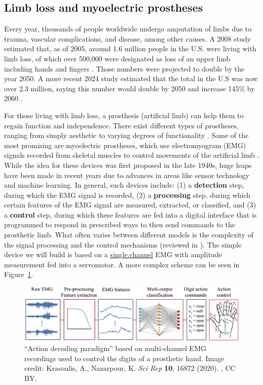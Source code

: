 \documentclass{article}
\begin{document}
\subsection{Limb loss and myoelectric prostheses}

Every year, thousands of people worldwide undergo amputation of limbs due to trauma, vascular complications, and disease, among other causes. A 2008 study estimated that, as of 2005, around 1.6 million people in the U.S. were living with limb loss, of which over 500,000 were designated as loss of an upper limb including hands and fingers \citep{ziegler2008estimating}. Those numbers were projected to double by the year 2050. A more recent 2024 study estimated that the total in the U.S was now over 2.3 million, saying this number would double by 2050 and increase 145\% by 2060 \citep{rivera2024estimating}.

For those living with limb loss, a prosthesis (artificial limb) can help them to regain function and independence. There exist different types of prostheses, ranging from simply aesthetic to varying degrees of functionality \citep{maat2018passive, ten20173d}. Some of the most promising are myoelectric prostheses, which use electromyogram (EMG) signals recorded from skeletal muscles to control movements of the artificial limb \citep{geethanjali2016myoelectric, iqbal2018review, igual2019myoelectric}. While the idea for these devices was first proposed in the late 1940s, huge leaps have been made in recent years due to advances in areas like sensor technology and machine learning. In general, such devices include: (1) a \textbf{detection} step, during which the EMG signal is recorded, (2) a \textbf{processing} step, during which certain features of the EMG signal are measured, extracted, or classified, and (3) a \textbf{control} step, during which these features are fed into a digital interface that is programmed to respond in prescribed ways to then send commands to the prosthetic limb. What often varies between different models is the complexity of the signal processing and the control mechanisms (reviewed in \citet{geethanjali2016myoelectric}). The simple device we will build is based on a \href{http://single.channel}{single.channel} EMG with amplitude measurement fed into a servomotor. A more complex scheme can be seen in Figure~\ref{w1uHQcGVm9}.

\begin{figure}[!htbp]
\centering
\includegraphics[width=1\linewidth]{files/EPpXta8zJdzN048lz8AR-b0dec1aab40cc143e6fe874233a554f2.png}
\caption[]{``Action decoding paradigm'' based on multi-channel EMG recordings used to control the digits of a prosthetic hand. Image credit: Krasoulis, A., Nazarpour, K. \textit{Sci Rep} \textbf{10}, 16872 (2020). \cite{Krasoulis_2020}, CC BY.}
\label{w1uHQcGVm9}
\end{figure}
\end{document}
